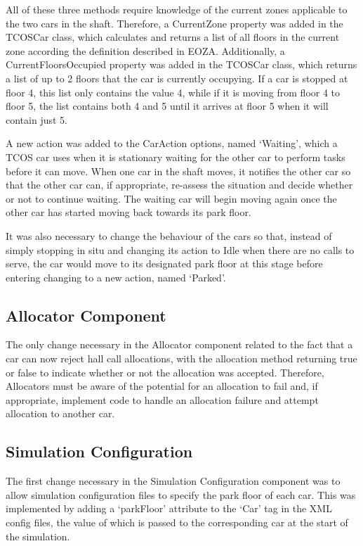 \documentclass{UoYCSproject}
\begin{document}
All of these three methods require knowledge of the current zones applicable to the two cars in the shaft.  Therefore, a CurrentZone property was added in the TCOSCar class, which calculates and returns a list of all floors in the current zone according the definition described in EOZA.  Additionally, a CurrentFloorsOccupied property was added in the TCOSCar class, which returns a list of up to 2 floors that the car is currently occupying.  If a car is stopped at floor 4, this list only contains the value 4, while if it is moving from floor 4 to floor 5, the list contains both 4 and 5 until it arrives at floor 5 when it will contain just 5.

A new action was added to the CarAction options, named `Waiting', which a TCOS car uses when it is stationary waiting for the other car to perform tasks before it can move.  When one car in the shaft moves, it notifies the other car so that the other car can, if appropriate, re-assess the situation and decide whether or not to continue waiting.  The waiting car will begin moving again once the other car has started moving back towards its park floor.

It was also necessary to change the behaviour of the cars so that, instead of simply stopping in situ and changing its action to Idle when there are no calls to serve, the car would move to its designated park floor at this stage before entering changing to a new action, named `Parked'.

\subsection{Allocator Component}

The only change necessary in the Allocator component related to the fact that a car can now reject hall call allocations, with the allocation method returning true or false to indicate whether or not the allocation was accepted.  Therefore, Allocators must be aware of the potential for an allocation to fail and, if appropriate, implement code to handle an allocation failure and attempt allocation to another car.

\subsection{Simulation Configuration}

The first change necessary in the Simulation Configuration component was to allow simulation configuration files to specify the park floor of each car.  This was implemented by adding a `parkFloor' attribute to the `Car' tag in the XML config files, the value of which is passed to the corresponding car at the start of the simulation.
\end{document}
